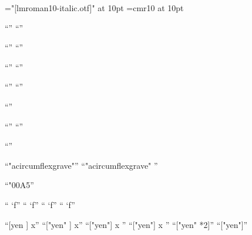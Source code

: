 \ifdefined\directlua
  
  
  \XeTeXemulate
\fi

\font\1="[lmroman10-italic.otf]" at 10pt\1
\font\2=cmr10 at 10pt

\edef\x{\the\XeTeXfonttype\1}“\x”
\edef\x{\the\XeTeXfonttype\2}“\x”

\edef\x{\the\XeTeXversion}“\x”
\edef\x{\XeTeXrevision}“\x”

\edef\x{\char\XeTeXfirstfontchar\1}“\x”
\edef\x{\char\XeTeXfirstfontchar\2}“\x”

\edef\x{\char\XeTeXlastfontchar\1}“\x”
\edef\x{\char\XeTeXlastfontchar\2}“\x”

\edef\x{}“\x”

\edef\x{\the\XeTeXcountglyphs\1}“\x”
\edef\x{\the\XeTeXcountglyphs\2}“\x”

\edef\x{\XeTeXglyphname{}}“\x”

\edef\x{\the\XeTeXglyphindex"acircumflexgrave"\relax}“\x”
\edef\x{\the\XeTeXglyphindex"acircumflexgrave" }“\x”

\edef\x{\the\XeTeXcharglyph"00A5}“\x”

\edef\x{\the{} \XeTeXcharglyph`f}“\x”
\edef\x{\the{} \XeTeXcharglyph`f}“\x”
\edef\x{\the{} \XeTeXcharglyph`f}“\x”
\edef\x{\the{} \XeTeXcharglyph`f}“\x”

\edef\x{[\the\XeTeXglyphindex yen ] x}“\x”
\edef\x{[\the\XeTeXglyphindex "yen" ] x}“\x”
\edef\x{[\the\XeTeXglyphindex"yen"\relax] x }“\x”
\edef\x{[\the\XeTeXglyphindex"yen"] x }“\x”
\edef\x{[\the\XeTeXglyphindex "yen" *2]}“\x”
\edef\x{[\the\XeTeXglyphindex "yen"]}“\x”

\bye
